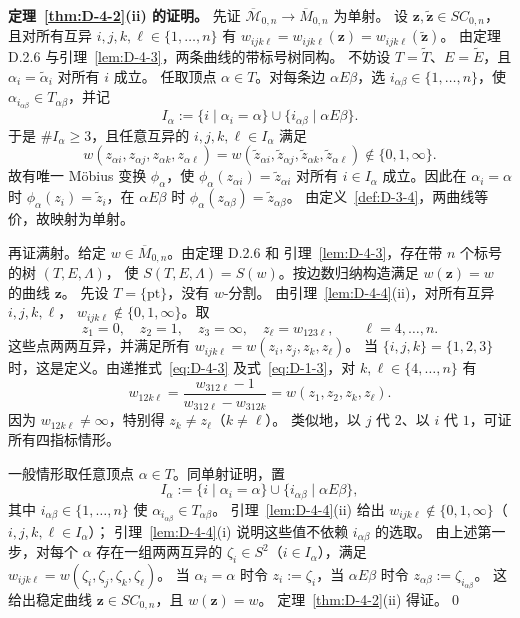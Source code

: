 \noindent\textbf{定理~\ref{thm:D-4-2}(ii) 的证明。}
先证 $\overline{\mathcal M}_{0,n}\to\overline M_{0,n}$ 为单射。
设 $\mathbf z,\widetilde{\mathbf z}\in SC_{0,n}$，且对所有互异
$i,j,k,\ell\in\{1,\ldots,n\}$ 有
$w_{ijk\ell}=w_{ijk\ell}(\mathbf z)=w_{ijk\ell}(\widetilde{\mathbf z})$。
由定理 D.2.6 与引理~\ref{lem:D-4-3}，两条曲线的带标号树同构。
不妨设 $T=\widetilde T$、$E=\widetilde E$，且
$\alpha_i=\widetilde\alpha_i$ 对所有 $i$ 成立。
任取顶点 $\alpha\in T$。对每条边 $\alpha E\beta$，选
$i_{\alpha\beta}\in\{1,\ldots,n\}$，使
$\alpha_{i_{\alpha\beta}}\in T_{\alpha\beta}$，并记
\[
  I_\alpha:=\{i\mid\alpha_i=\alpha\}
  \cup\{i_{\alpha\beta}\mid\alpha E\beta\}.
\]
于是 $\#I_\alpha\ge3$，且任意互异的
$i,j,k,\ell\in I_\alpha$ 满足
\[
  w(z_{\alpha i},z_{\alpha j},z_{\alpha k},z_{\alpha\ell})
  =w(\widetilde z_{\alpha i},\widetilde z_{\alpha j},
     \widetilde z_{\alpha k},\widetilde z_{\alpha\ell})
  \notin\{0,1,\infty\}.
\]
故有唯一 Möbius 变换 $\phi_\alpha$，使
$\phi_\alpha(z_{\alpha i})=\widetilde z_{\alpha i}$ 对所有
$i\in I_\alpha$ 成立。因此在 $\alpha_i=\alpha$ 时
$\phi_\alpha(z_i)=\widetilde z_i$，在 $\alpha E\beta$ 时
$\phi_\alpha(z_{\alpha\beta})=\widetilde z_{\alpha\beta}$。
由定义~\ref{def:D-3-4}，两曲线等价，故映射为单射。

再证满射。给定 $w\in\overline M_{0,n}$。由定理 D.2.6 和
引理~\ref{lem:D-4-3}，存在带 $n$ 个标号的树 $(T,E,\Lambda)$，
使 $S(T,E,\Lambda)=S(w)$。按边数归纳构造满足 $w(\mathbf z)=w$
的曲线 $\mathbf z$。
先设 $T=\{\mathrm{pt}\}$，没有 $w$-分割。
由引理~\ref{lem:D-4-4}(ii)，对所有互异 $i,j,k,\ell$，
$w_{ijk\ell}\notin\{0,1,\infty\}$。取
\[
  z_1=0,\quad z_2=1,\quad z_3=\infty,\quad
  z_\ell=w_{123\ell},\qquad \ell=4,\ldots,n.
\]
这些点两两互异，并满足所有 $w_{ijk\ell}=w(z_i,z_j,z_k,z_\ell)$。
当 $\{i,j,k\}=\{1,2,3\}$ 时，这是定义。由递推式~\eqref{eq:D-4-3}
及式~\eqref{eq:D-1-3}，对 $k,\ell\in\{4,\ldots,n\}$ 有
\[
  w_{12k\ell}=
  \frac{w_{312\ell}-1}{w_{312\ell}-w_{312k}}
  =w(z_1,z_2,z_k,z_\ell).
\]
因为 $w_{12k\ell}\ne\infty$，特别得 $z_k\ne z_\ell$（$k\ne\ell$）。
类似地，以 $j$ 代 $2$、以 $i$ 代 $1$，可证所有四指标情形。

一般情形取任意顶点 $\alpha\in T$。同单射证明，置
\[
  I_\alpha:=\{i\mid\alpha_i=\alpha\}
  \cup\{i_{\alpha\beta}\mid\alpha E\beta\},
\]
其中 $i_{\alpha\beta}\in\{1,\ldots,n\}$ 使
$\alpha_{i_{\alpha\beta}}\in T_{\alpha\beta}$。
引理~\ref{lem:D-4-4}(ii) 给出
$w_{ijk\ell}\notin\{0,1,\infty\}$（$i,j,k,\ell\in I_\alpha$）；
引理~\ref{lem:D-4-4}(i) 说明这些值不依赖 $i_{\alpha\beta}$ 的选取。
由上述第一步，对每个 $\alpha$ 存在一组两两互异的
$\zeta_i\in S^2$（$i\in I_\alpha$），满足
$w_{ijk\ell}=w(\zeta_i,\zeta_j,\zeta_k,\zeta_\ell)$。
当 $\alpha_i=\alpha$ 时令 $z_i:=\zeta_i$，当 $\alpha E\beta$ 时令
$z_{\alpha\beta}:=\zeta_{i_{\alpha\beta}}$。
这给出稳定曲线 $\mathbf z\in SC_{0,n}$，且 $w(\mathbf z)=w$。
定理~\ref{thm:D-4-2}(ii) 得证。\qed

